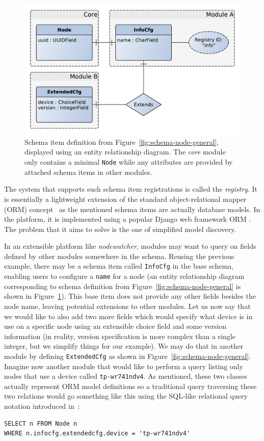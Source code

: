 \documentclass[5p,sort&compress]{elsarticle}
\newcommand{\nodewatcher}{\textit{nodewatcher}}
\begin{document}
\begin{figure}
  \centering
  \includegraphics[scale=0.47]{figures/registry-example-models.pdf}
  \caption{Schema item definition from Figure~\ref{fig:schema-node-general}, displayed using an entity relationship diagram.
  The \textit{core} module only contains a minimal \texttt{Node} while any attributes are provided by attached schema items in other modules.}
  \label{fig:registry-schema-example}
\end{figure}

The system that supports such schema item registrations is called the \textit{registry}.
It is essentially a lightweight extension of the standard object-relational mapper (ORM) concept~\cite{Bernstein_2007,ONeil_2008} as the mentioned schema items are actually database models.
In the platform, it is implemented using a popular Django web framework ORM \cite{django_2005}.
The problem that it aims to solve is the one of simplified model discovery.

In an extensible platform like \nodewatcher{}, modules may want to query on fields defined by other modules somewhere in the schema.
Reusing the previous example, there may be a schema item called \texttt{InfoCfg} in the base schema, enabling users to configure a \texttt{name} for a node (an entity relationship diagram corresponding to schema definition from Figure~\ref{fig:schema-node-general} is shown in Figure~\ref{fig:registry-schema-example}).
This base item does not provide any other fields besides the node name, leaving potential extensions to other modules.
Let us now say that we would like to also add two more fields which would specify what device is in use on a specific node using an extensible choice field and some version information (in reality, version specification is more complex than a single integer, but we simplify things for our example).
We may do that in another module by defining \texttt{ExtendedCfg} as shown in Figure~\ref{fig:schema-node-general}.
Imagine now another module that would like to perform a query listing only nodes that use a device called \texttt{tp-wr741ndv4}.
As mentioned, these two classes actually represent ORM model definitions so a traditional query traversing these two relations would go something like this using the SQL-like relational query notation introduced in~\cite{ONeil_2008}:
\begin{verbatim}
SELECT n FROM Node n
WHERE n.infocfg.extendedcfg.device = 'tp-wr741ndv4'
\end{verbatim}
\end{document}

